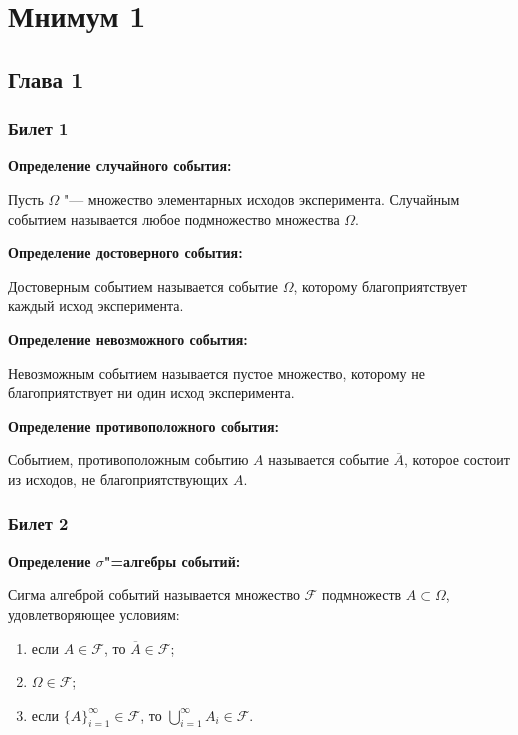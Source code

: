 



\tableofcontents

\newpage

\section{Мнимум 1}

\subsection{Глава 1}

\subsubsection{Билет 1}

\textbf{Определение случайного события:}
    \smallskip

    Пусть $\Omega$ "--- множество элементарных
    исходов эксперимента. Случайным событием
    называется любое подмножество множества
    $\Omega$.
    \bigskip

\textbf{Определение достоверного события:}
    \smallskip

    Достоверным событием называется событие
    $\Omega$, которому благоприятствует
    каждый исход эксперимента.
    \bigskip

\textbf{Определение невозможного события:}
    \smallskip
    
    Невозможным событием называется пустое
    множество, которому не благоприятствует ни
    один исход эксперимента.
    \bigskip

\textbf{Определение противоположного события:}
    \smallskip
    
    Событием, противоположным событию 
    $A$ называется событие $\overline{A}$, которое
    состоит из исходов, не благоприятствующих $A$.
    \bigskip

\subsubsection{Билет 2}

\textbf{Определение $\sigma$"=алгебры событий:}
    \smallskip

    Сигма алгеброй событий называется множество
    $\mathcal{F}$ подмножеств $A \subset \Omega$,
    удовлетворяющее условиям:

    \begin{enumerate}
        \item{если $A \in \mathcal{F}$, то
        $\overline{A} \in \mathcal{F}$;}
        \item{$\Omega \in \mathcal{F}$;}
        \item{если $\{A\}_{i = 1}^{\infty} \in
        \mathcal{F}$, то
        $\bigcup\limits_{i = 1}^{\infty} A_i \in 
        \mathcal{F}$.}
    \end{enumerate}
    \bigskip


